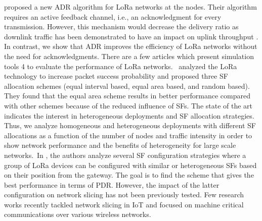  \cite{kim_adaptive_2017}   \citet{kim_adaptive_2017} proposed a new ADR algorithm for LoRa networks at the nodes. Their algorithm requires an active feedback channel, i.e., an acknowledgment for every transmission. However, this mechanism would decrease the delivery ratio as downlink traffic has been demonstrated to have an impact on uplink throughput \cite{pop_does_2017}. In contrast, we show that ADR improves the efficiency of LoRa networks without the need for acknowledgments. There are a few articles which present simulation tools 4 to evaluate the performance of LoRa networks.~   \newline 
 \cite{lim_spreading_2018}   \citet{lim_spreading_2018} analyzed the LoRa technology to increase packet success probability and proposed three SF allocation schemes (equal interval based, equal area based, and random based). They found that the equal area scheme results in better performance compared with other schemes because of the reduced influence of SFs. The state of the art indicates the interest in heterogeneous deployments and SF allocation strategies. Thus, we analyze homogeneous and heterogeneous deployments with different SF allocations as a function of the number of nodes and traffic intensity in order to show network performance and the benefits of heterogeneity for large scale networks.~In \cite{lim_spreading_2018}, the authors analyze several SF configuration strategies where a group of LoRa devices can be configured with similar or heterogeneous SFs based on their position from the gateway. The goal is to find the scheme that gives the best performance in terms of PDR. However, the impact of the latter configuration on network slicing has not been previously tested. Few research works recently tackled network slicing in IoT and focused on machine critical communications over various wireless networks.   \newline 
